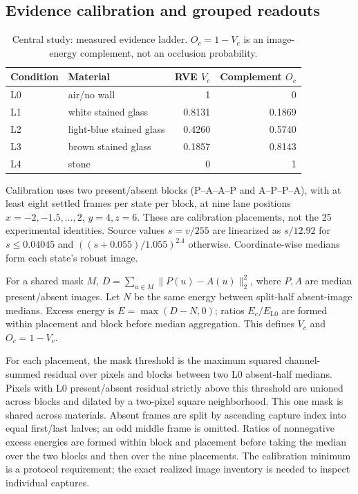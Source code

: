 \documentclass{article}
\begin{document}
\subsection{Evidence calibration and grouped readouts}
\begin{table}[!htbp]
\caption{Central study: measured evidence ladder. $O_c=1-V_c$ is an image-energy complement, not an occlusion probability.}
\label{tab:exp3-ladder}
\centering\small
\begin{tabular}{@{}llrr@{}}
\toprule
Condition & Material & RVE $V_c$ & Complement $O_c$\\
\midrule
L0 & air/no wall & 1 & 0\\
L1 & white stained glass & 0.8131 & 0.1869\\
L2 & light-blue stained glass & 0.4260 & 0.5740\\
L3 & brown stained glass & 0.1857 & 0.8143\\
L4 & stone & 0 & 1\\
\bottomrule
\end{tabular}
\end{table}
Calibration uses two present/absent blocks (P--A--A--P and A--P--P--A), with at least eight settled frames per state per block, at nine lane positions $x=-2,-1.5,\ldots,2$, $y=4,z=6$. These are calibration placements, not the 25 experimental identities. Source values $s=v/255$ are linearized as $s/12.92$ for $s\leq0.04045$ and $((s+0.055)/1.055)^{2.4}$ otherwise. Coordinate-wise medians form each state's robust image.

For a shared mask $M$, $D=\sum_{u\in M}\|P(u)-A(u)\|_2^2$, where $P,A$ are median present/absent images. Let $N$ be the same energy between split-half absent-image medians. Excess energy is $E=\max(D-N,0)$; ratios $E_c/E_{\mathrm{L0}}$ are formed within placement and block before median aggregation. This defines $V_c$ and $O_c=1-V_c$.

For each placement, the mask threshold is the maximum squared channel-summed residual over pixels and blocks between two L0 absent-half medians. Pixels with L0 present/absent residual strictly above this threshold are unioned across blocks and dilated by a two-pixel square neighborhood. This one mask is shared across materials. Absent frames are split by ascending capture index into equal first/last halves; an odd middle frame is omitted. Ratios of nonnegative excess energies are formed within block and placement before taking the median over the two blocks and then over the nine placements. The calibration minimum is a protocol requirement; the exact realized image inventory is needed to inspect individual captures.
\end{document}
